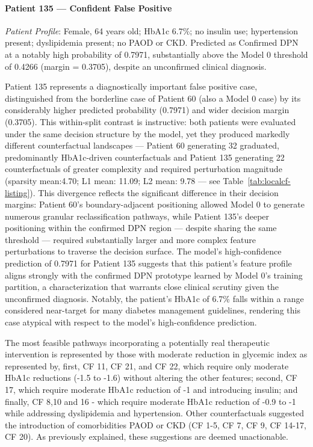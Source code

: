 \documentclass[pdflatex,sn-vancouver-num]{sn-jnl}
\begin{document}
\paragraph{Patient 135 --- Confident False Positive}
\textit{Patient Profile}: Female, 64 years old; HbA1c 6.7\%; no insulin use; hypertension present; dyslipidemia present; no PAOD or CKD. Predicted as Confirmed DPN at a notably high probability of 0.7971, substantially above the Model 0 threshold of 0.4266 (margin = 0.3705), despite an unconfirmed clinical diagnosis.

Patient 135 represents a diagnostically important false positive case, distinguished from the borderline case of Patient 60 (also a Model 0 case) by its considerably higher predicted probability (0.7971) and wider decision margin (0.3705). This within-split contrast is instructive: both patients were evaluated under the same decision structure by the model, yet they produced markedly different counterfactual landscapes — Patient 60 generating 32 graduated, predominantly HbA1c-driven counterfactuals and Patient 135 generating 22 counterfactuals of greater complexity and required perturbation magnitude (sparsity mean:4.70; L1 mean: 11.09; L2 mean: 9.78 --- see Table~\ref{tab:localcf-listing}). This divergence reflects the significant difference in their decision margins: Patient 60's boundary-adjacent positioning allowed Model 0 to generate numerous granular reclassification pathways, while Patient 135's deeper positioning within the confirmed DPN region — despite sharing the same threshold — required substantially larger and more complex feature perturbations to traverse the decision surface. The model's high-confidence prediction of 0.7971 for Patient 135 suggests that this patient's feature profile aligns strongly with the confirmed DPN prototype learned by Model 0's training partition, a characterization that warrants close clinical scrutiny given the unconfirmed diagnosis. Notably, the patient's HbA1c of 6.7\% falls within a range considered near-target for many diabetes management guidelines, rendering this case atypical with respect to the model's high-confidence prediction.

The most feasible pathways incorporating a potentially real therapeutic intervention is represented by those with moderate reduction in glycemic index as represented by, first, CF 11, CF 21, and CF 22, which require only moderate HbA1c reductions (-1.5 to -1.6) without altering the other features; second, CF 17, which require moderate HbA1c reduction of -1 and introducing insulin; and finally, CF 8,10 and 16 - which require moderate HbA1c reduction of -0.9 to -1 while addressing dyslipidemia and hypertension. Other counterfactuals suggested the introduction of comorbidities PAOD or CKD (CF 1-5, CF 7, CF 9, CF 14-17, CF 20). As previously explained, these suggestions are deemed unactionable. 
\end{document}
